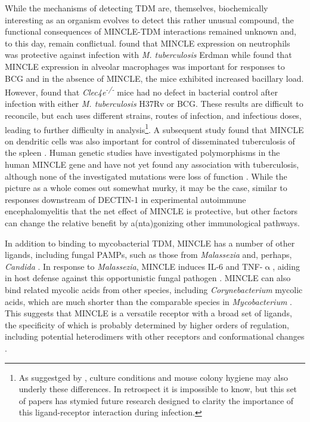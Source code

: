 While the mechanisms of detecting TDM are, themselves, biochemically interesting as an organism evolves to detect this rather unusual compound, the functional consequences of MINCLE\hyp{}TDM interactions remained unknown and, to this day, remain conflictual. \citet{Lee2012} found that MINCLE expression on neutrophils was protective against infection with \textit{M. tuberculosis} Erdman while \citet{Behler2012} found that MINCLE expression in alveolar macrophages was important for responses to BCG and in the absence of MINCLE, the mice exhibited increased bacillary load. However, \citet{Heitmann2013} found that \textit{Clec4e\textsuperscript{\hyp{}/\hyp{}}} mice had no defect in bacterial control after infection with either \textit{M. tuberculosis} H37Rv or BCG. These results are difficult to reconcile, but each uses different strains, routes of infection, and infectious doses, leading to further difficulty in analysis\footnote{As suggestged by \citet{Lang2013}, culture conditions and mouse colony hygiene may also underly these differences. In retrospect it is impossible to know, but this set of papers has stymied future research designed to clarity the importance of this ligand\hyp{}receptor interaction during infection.}. A subsequent study found that MINCLE on dendritic cells was also important for control of disseminated tuberculosis of the spleen \citep{Behler2015}. Human genetic studies have investigated polymorphisms in the human MINCLE gene and have not yet found any association with tuberculosis, although none of the investigated mutations were loss of function \citep{Bowker2016}. While the picture as a whole comes out somewhat murky, it may be the case, similar to responses downstream of DECTIN\hyp{}1 in experimental autoimmune encephalomyelitis that the net effect of MINCLE is protective, but other factors can change the relative benefit by a(nta)gonizing other immunological pathways.

In addition to binding to mycobacterial TDM, MINCLE has a number of other ligands, including fungal PAMPs, such as those from \textit{Malassezia} and, perhaps, \textit{Candida} \citep{Yamasaki2009, Wells2008, Ishikawa2013}. In response to \textit{Malassezia}, MINCLE induces IL\hyp{}6 and TNF\hyp{}$\upalpha$, aiding in host defense against this opportunistic fungal pathogen \citep{Lu2018}. MINCLE can also bind related mycolic acids from other species, including \textit{Corynebacterium} mycolic acids, which are much shorter than the comparable species in \textit{Mycobacterium} \citep{vanderPeet2015}. This suggests that MINCLE is a versatile receptor with a broad set of ligands, the specificity of which is probably determined by higher orders of regulation, including potential heterodimers with other receptors and conformational changes \citep{Jegouzo2014}.

